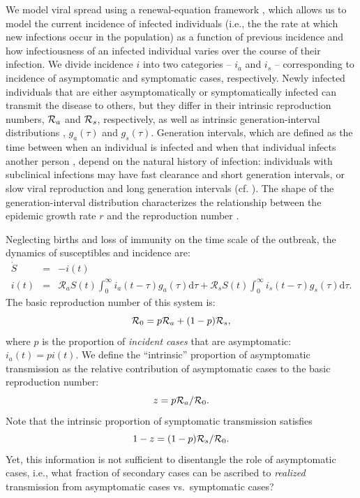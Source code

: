 We model viral spread using a renewal-equation framework \citep{heesterbeek1996concept}, which allows us to model the current incidence of infected individuals (i.e., the the rate at which new infections occur in the population) as a function of previous incidence and how infectiousness of an infected individual varies over the course of their infection.
We divide incidence $i$ into two categories -- $i_a$ and $i_s$ -- corresponding to incidence of asymptomatic and symptomatic cases, respectively.
Newly infected individuals that are either asymptomatically or symptomatically infected can transmit the disease to others, but they differ in their intrinsic reproduction numbers, ${\cal{R}}_a$ and ${\cal{R}}_s$, respectively, as well as intrinsic generation-interval distributions \citep{champredon2015intrinsic}, $g_a(\tau)$ and $g_s(\tau)$.
Generation intervals, which are defined as the time between when an individual is infected and when that individual infects another person \citep{svensson2007note}, depend on the natural history of infection:
individuals with subclinical infections may have fast clearance and short generation intervals, or slow viral reproduction and long generation intervals (cf. \citep{roberts2007model}).
The shape of the generation-interval distribution characterizes the relationship between the epidemic growth rate $r$ and the reproduction number \citep{wallinga2007generation}.

Neglecting births and loss of immunity on the time scale of the outbreak, the dynamics of susceptibles and incidence are:
\begin{eqnarray}
\dot{S}&=&-i(t) \\
i(t)&=&\mathcal R_a S(t) \int_0^\infty i_a(t-\tau) g_a(\tau) \mathrm{d}\tau + \mathcal R_s S(t) \int_0^\infty i_s(t-\tau) g_s(\tau) \mathrm{d}\tau.
\end{eqnarray}
The basic reproduction number of this system is:
\begin{equation}
{\cal{R}}_{0}= p {\cal{R}}_a + (1-p) {\cal{R}}_s,
\end{equation}
where $p$ is the proportion of \emph{incident cases} that are asymptomatic: $i_a(t) = p i(t)$.
We define the ``intrinsic'' proportion of asymptomatic transmission as the relative contribution of asymptomatic cases to the basic reproduction number:
\begin{equation}
z = p {\cal{R}}_a/{\cal{R}}_{0}.
\end{equation}
Note that the intrinsic proportion of symptomatic transmission satisfies
\begin{equation}
1-z = (1-p) {\cal{R}}_s/{\cal{R}}_{0}.
\end{equation}
Yet, this information is not sufficient to disentangle the role of asymptomatic cases, i.e., what fraction of secondary cases can be ascribed to \emph{realized} transmission from asymptomatic cases vs.~symptomatic cases?

